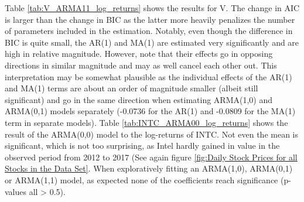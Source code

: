 Table \ref{tab:V_ARMA11_log_returns} shows the results for V. The change in AIC is larger than the change in BIC as the latter more heavily penalizes the number of parameters included in the estimation. Notably, even though the difference in BIC is quite small, the AR(1) and MA(1) are estimated very significantly and are high in relative magnitude. However, note that their effects go in opposing directions in similar magnitude and may as well cancel each other out. This interpretation may be somewhat plausible as the individual effects of the AR(1) and MA(1) terms are about an order of magnitude smaller (albeit still significant) and go in the same direction when estimating ARMA(1,0) and ARMA(0,1) models separately (-0.0736 for the AR(1) and -0.0809 for the MA(1) term in separate models). 
Table \ref{tab:INTC_ARMA00_log_returns} shows the result of the ARMA(0,0) model to the log-returns of INTC. Not even the mean is significant, which is not too surprising, as Intel hardly gained in value in the observed period from 2012 to 2017 (See again figure \ref{fig:Daily Stock Prices for all Stocks in the Data Set}. When exploratively fitting an ARMA(1,0), ARMA(0,1) or ARMA(1,1) model, as expected none of the coefficients reach significance (p-values all > 0.5). 

\begin{table}[h]
    \centering
    
    \caption{}
    \label{tab:V_ARMA11_log_returns}
\end{table}{}

\begin{table}[h!]
    \centering
    
    \caption{}
    \label{tab:V_ARMA11_log_returns}
\end{table}{}

\begin{table}[h!]
    \centering
    
    \caption{}
    \label{tab:INTC_ARMA00_log_returns}
\end{table}{}


